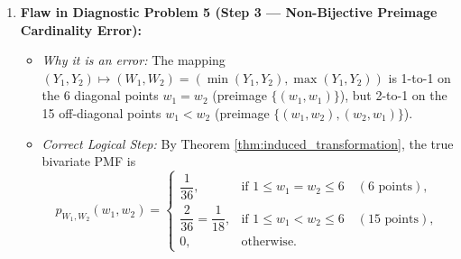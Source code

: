 \documentclass[11pt, letterpaper]{article}
\theoremstyle{definition}
\theoremstyle{remark}
\begin{document}
\begin{enumerate}[label=\textbf{Resolution \arabic*:}]
    \item \textbf{Flaw in Diagnostic Problem 5 (Step 3 --- Non-Bijective Preimage Cardinality Error):}
    \begin{itemize}
        \item \emph{Why it is an error:} The mapping $(Y_1, Y_2) \mapsto (W_1, W_2) = (\min(Y_1, Y_2), \max(Y_1, Y_2))$ is 1-to-1 on the 6 diagonal points $w_1 = w_2$ (preimage $\{(w_1, w_1)\}$), but 2-to-1 on the 15 off-diagonal points $w_1 < w_2$ (preimage $\{(w_1, w_2), (w_2, w_1)\}$).
        \item \emph{Correct Logical Step:} By Theorem \ref{thm:induced_transformation}, the true bivariate PMF is
        \[
        p_{W_1, W_2}(w_1, w_2) = \begin{cases}
        \dfrac{1}{36}, & \text{if } 1 \le w_1 = w_2 \le 6 \quad (6 \text{ points}), \\[8pt]
        \dfrac{2}{36} = \dfrac{1}{18}, & \text{if } 1 \le w_1 < w_2 \le 6 \quad (15 \text{ points}), \\[6pt]
        0, & \text{otherwise}.
        \end{cases}
        \]
    \end{itemize}
\end{enumerate}
\end{document}
